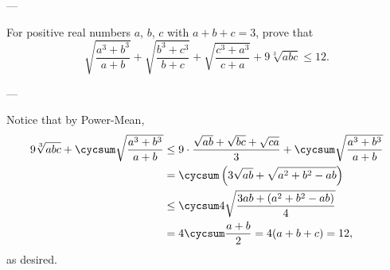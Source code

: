 
---

For positive real numbers $a$, $b$, $c$ with $a+b+c=3$, prove that \[\sqrt{\frac{a^3+b^3}{a+b}}+\sqrt{\frac{b^3+c^3}{b+c}}+\sqrt{\frac{c^3+a^3}{c+a}}+9\sqrt[3]{abc}\le12.\]

---

Notice that by Power-Mean,
\begin{align*}
    9\sqrt[3]{abc}+\cycsum\sqrt{\frac{a^3+b^3}{a+b}}&\le9\cdot\frac{\sqrt{ab}+\sqrt{bc}+\sqrt{ca}}3+\cycsum\sqrt{\frac{a^3+b^3}{a+b}}\\
    &=\cycsum\left(3\sqrt{ab}+\sqrt{a^2+b^2-ab}\right)\\
    &\le\cycsum4\sqrt{\frac{3ab+\left(a^2+b^2-ab\right)}4}\\
    &=4\cycsum\frac{a+b}2=4(a+b+c)=12,
\end{align*}
as desired.
